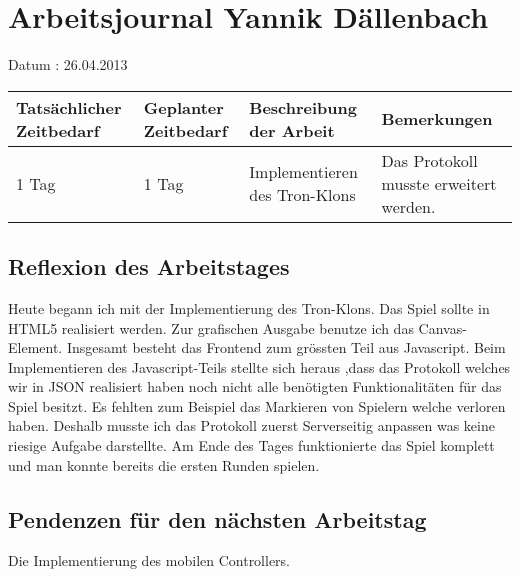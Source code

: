 \documentclass{scrartcl}
\begin{document}
	\section*{Arbeitsjournal Yannik Dällenbach}

	Datum : 26.04.2013
	\\

	\begin{tabularx}{\textwidth}{| m{2cm} | m{2cm} | X | X |}
	\hline
	Tatsächlicher Zeitbedarf & Geplanter Zeitbedarf & Beschreibung der Arbeit & Bemerkungen \\
	\hline
	1 Tag & 1 Tag & Implementieren des Tron-Klons & Das Protokoll musste erweitert werden. \\
	\hline
	\end{tabularx}

	\subsection*{Reflexion des Arbeitstages}
	Heute begann ich mit der Implementierung des Tron-Klons. Das Spiel sollte in 
	HTML5 realisiert werden. Zur grafischen Ausgabe benutze ich 
	das Canvas-Element. Insgesamt besteht das Frontend zum grössten Teil
	aus Javascript. Beim Implementieren des Javascript-Teils stellte sich heraus
	,dass das Protokoll welches wir in JSON realisiert haben noch nicht alle
	benötigten Funktionalitäten für das Spiel besitzt. Es fehlten zum Beispiel
	das Markieren von Spielern welche verloren haben. Deshalb musste ich das 
	Protokoll zuerst Serverseitig anpassen was keine riesige Aufgabe darstellte.
	Am Ende des Tages funktionierte das Spiel komplett und man konnte bereits die
	ersten Runden spielen.
	\subsection*{Pendenzen für den nächsten Arbeitstag}
	Die Implementierung des mobilen Controllers.
\end{document}
